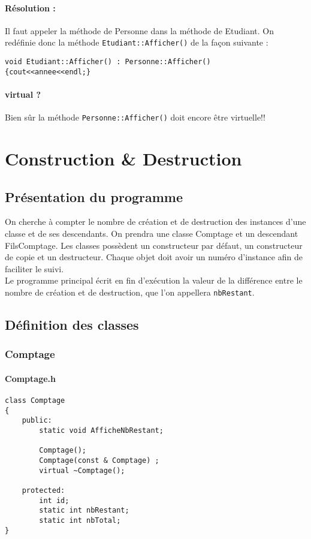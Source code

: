 \documentclass[10pt,a4paper,twoside]{article}
\begin{document}
\paragraph{Résolution :} Il faut appeler la méthode de Personne dans la méthode de Etudiant. On redéfinie donc la méthode \verb=Etudiant::Afficher()= de la façon suivante :
\begin{verbatim}
void Etudiant::Afficher() : Personne::Afficher()
{cout<<annee<<endl;}
\end{verbatim}

\paragraph{virtual ?} Bien sûr la méthode \verb=Personne::Afficher()= doit encore être virtuelle!!

\section{Construction \& Destruction}
\subsection{Présentation du programme}
On cherche à compter le nombre de création et de destruction des instances d'une classe et de ses descendants. On prendra une classe Comptage et un descendant FilsComptage. Les classes possèdent un constructeur par défaut, un constructeur de copie et un destructeur. Chaque objet doit avoir un numéro d'instance afin de faciliter le suivi.\\
Le programme principal écrit en fin d'exécution la valeur de la différence entre le nombre de création et de destruction, que l'on appellera \verb=nbRestant=.

\subsection{Définition des classes}
\subsubsection{Comptage}
\paragraph{Comptage.h}
\begin{verbatim}
class Comptage
{
    public:
        static void AfficheNbRestant;
        
        Comptage();
        Comptage(const & Comptage) ;
        virtual ~Comptage();
        
    protected:
        int id;
        static int nbRestant;
        static int nbTotal;
}
\end{verbatim}
\end{document}

